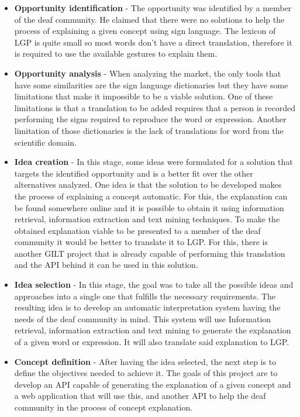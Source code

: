 \begin{itemize}
    \item \textbf{Opportunity identification} - The opportunity was identified by a member of the deaf community.
    He claimed that there were no solutions to help the process of explaining a given concept using sign language.
    The lexicon of \gls{LGP} is quite small so most words don't have a direct translation, therefore it is required to use the available gestures to explain them.

    \item \textbf{Opportunity analysis} - When analyzing the market, the only tools that have some similarities are the sign language dictionaries but they have some limitations that make it impossible to be a viable solution.
    One of these limitations is that a translation to be added requires that a person is recorded performing the signs required to reproduce the word or expression.
    Another limitation of those dictionaries is the lack of translations for word from the scientific domain.

    \item \textbf{Idea creation} - In this stage, some ideas were formulated for a solution that targets the identified opportunity and is a better fit over the other alternatives analyzed.
    One idea is that the solution to be developed makes the process of explaining a concept automatic.
    For this, the explanation can be found somewhere online and it is possible to obtain it using information retrieval, information extraction and text mining techniques.
    To make the obtained explanation viable to be presented to a member of the deaf community it would be better to translate it to \gls{LGP}.
    For this, there is another GILT project that is already capable of performing this translation and the \gls{API} behind it can be used in this solution.

    \item \textbf{Idea selection} - In this stage, the goal was to take all the possible ideas and approaches into a single one that fulfills the necessary requirements.
    The resulting idea is to develop an automatic interpretation system having the needs of the deaf community in mind.
    This system will use Information retrieval, information extraction and text mining to generate the explanation of a given word or expression.
    It will also translate said explanation to \gls{LGP}.

    \item \textbf{Concept definition} - After having the idea selected, the next step is to define the objectives needed to achieve it.
    The goals of this project are to develop an \gls{API} capable of generating the explanation of a given concept and a web application that will use this, and another \gls{API} to help the deaf community in the process of concept explanation.

\end{itemize}

